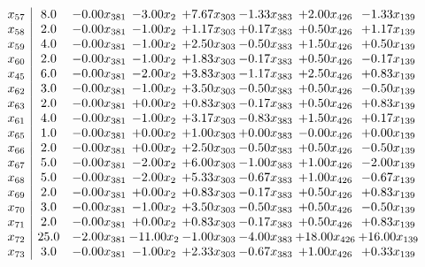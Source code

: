 \documentclass[8pt]{article}
\begin{document}
\[\begin{array}{c| c c@{\hskip 2pt} c@{\hskip 2pt} c@{\hskip 2pt} c@{\hskip 2pt} c@{\hskip 2pt} c@{\hskip 2pt} }
 x_{57}   &  8.0 & -0.00 x_{381} & -3.00 x_{2} & +  7.67 x_{303} & -1.33 x_{383} & +  2.00 x_{426} & -1.33 x_{139}\\
 x_{58}   &  2.0 & -0.00 x_{381} & -1.00 x_{2} & +  1.17 x_{303} & +  0.17 x_{383} & +  0.50 x_{426} & +  1.17 x_{139}\\
 x_{59}   &  4.0 & -0.00 x_{381} & -1.00 x_{2} & +  2.50 x_{303} & -0.50 x_{383} & +  1.50 x_{426} & +  0.50 x_{139}\\
 x_{60}   &  2.0 & -0.00 x_{381} & -1.00 x_{2} & +  1.83 x_{303} & -0.17 x_{383} & +  0.50 x_{426} & -0.17 x_{139}\\
 x_{45}   &  6.0 & -0.00 x_{381} & -2.00 x_{2} & +  3.83 x_{303} & -1.17 x_{383} & +  2.50 x_{426} & +  0.83 x_{139}\\
 x_{62}   &  3.0 & -0.00 x_{381} & -1.00 x_{2} & +  3.50 x_{303} & -0.50 x_{383} & +  0.50 x_{426} & -0.50 x_{139}\\
 x_{63}   &  2.0 & -0.00 x_{381} & +  0.00 x_{2} & +  0.83 x_{303} & -0.17 x_{383} & +  0.50 x_{426} & +  0.83 x_{139}\\
 x_{61}   &  4.0 & -0.00 x_{381} & -1.00 x_{2} & +  3.17 x_{303} & -0.83 x_{383} & +  1.50 x_{426} & +  0.17 x_{139}\\
 x_{65}   &  1.0 & -0.00 x_{381} & +  0.00 x_{2} & +  1.00 x_{303} & +  0.00 x_{383} & -0.00 x_{426} & +  0.00 x_{139}\\
 x_{66}   &  2.0 & -0.00 x_{381} & +  0.00 x_{2} & +  2.50 x_{303} & -0.50 x_{383} & +  0.50 x_{426} & -0.50 x_{139}\\
 x_{67}   &  5.0 & -0.00 x_{381} & -2.00 x_{2} & +  6.00 x_{303} & -1.00 x_{383} & +  1.00 x_{426} & -2.00 x_{139}\\
 x_{68}   &  5.0 & -0.00 x_{381} & -2.00 x_{2} & +  5.33 x_{303} & -0.67 x_{383} & +  1.00 x_{426} & -0.67 x_{139}\\
 x_{69}   &  2.0 & -0.00 x_{381} & +  0.00 x_{2} & +  0.83 x_{303} & -0.17 x_{383} & +  0.50 x_{426} & +  0.83 x_{139}\\
 x_{70}   &  3.0 & -0.00 x_{381} & -1.00 x_{2} & +  3.50 x_{303} & -0.50 x_{383} & +  0.50 x_{426} & -0.50 x_{139}\\
 x_{71}   &  2.0 & -0.00 x_{381} & +  0.00 x_{2} & +  0.83 x_{303} & -0.17 x_{383} & +  0.50 x_{426} & +  0.83 x_{139}\\
 x_{72}   &  25.0 & -2.00 x_{381} & -11.00 x_{2} & -1.00 x_{303} & -4.00 x_{383} & + 18.00 x_{426} & + 16.00 x_{139}\\
 x_{73}   &  3.0 & -0.00 x_{381} & -1.00 x_{2} & +  2.33 x_{303} & -0.67 x_{383} & +  1.00 x_{426} & +  0.33 x_{139}\\

\end{array}\]
\end{document}

